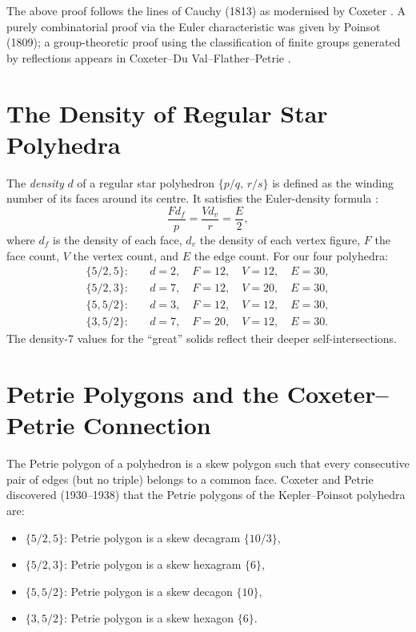 \begin{remark}
The above proof follows the lines of Cauchy (1813) as
modernised by Coxeter \cite{coxeter_regular_polytopes}.  A purely
combinatorial proof via the Euler characteristic was given by
Poinsot (1809); a group-theoretic proof using the classification
of finite groups generated by reflections appears in
Coxeter–Du Val–Flather–Petrie \cite{coxeter_fifty_nine_icosahedra}.
\end{remark}

\section{The Density of Regular Star Polyhedra}
\label{sec:density}

The \emph{density} $d$ of a regular star polyhedron
$\{p/q,\, r/s\}$ is defined as the winding number of its faces
around its centre.  It satisfies the Euler-density formula
\cite{coxeter_regular_polytopes}:
\[
  \frac{F d_f}{p} = \frac{V d_v}{r} = \frac{E}{2},
\]
where $d_f$ is the density of each face, $d_v$ the density of
each vertex figure, $F$ the face count, $V$ the vertex count,
and $E$ the edge count.  For our four polyhedra:
\begin{align*}
  \{5/2,5\}:&\quad d=2,\quad F=12,\quad V=12,\quad E=30,\\
  \{5/2,3\}:&\quad d=7,\quad F=12,\quad V=20,\quad E=30,\\
  \{5,5/2\}:&\quad d=3,\quad F=12,\quad V=12,\quad E=30,\\
  \{3,5/2\}:&\quad d=7,\quad F=20,\quad V=12,\quad E=30.
\end{align*}
The density-7 values for the ``great'' solids reflect their
deeper self-intersections.

\section{Petrie Polygons and the Coxeter--Petrie Connection}
\label{sec:petrie}

The Petrie polygon of a polyhedron is a skew polygon such that
every consecutive pair of edges (but no triple) belongs to a
common face.  Coxeter and Petrie discovered (1930--1938)
\cite{coxeter_regular_polytopes} that the Petrie polygons of the
Kepler–Poinsot polyhedra are:
\begin{itemize}
  \item $\{5/2,5\}$: Petrie polygon is a skew decagram
        $\{10/3\}$,
  \item $\{5/2,3\}$: Petrie polygon is a skew hexagram
        $\{6\}$,
  \item $\{5,5/2\}$: Petrie polygon is a skew decagon
        $\{10\}$,
  \item $\{3,5/2\}$: Petrie polygon is a skew hexagon
        $\{6\}$.
\end{itemize}

